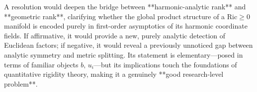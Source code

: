 A resolution would deepen the bridge between **harmonic-analytic rank** and **geometric rank**, clarifying whether the global product structure of a \(\mathrm{Ric}\ge0\) manifold is encoded purely in first-order asymptotics of its harmonic coordinate fields.  
If affirmative, it would provide a new, purely analytic detection of Euclidean factors; if negative, it would reveal a previously unnoticed gap between analytic symmetry and metric splitting.  
Its statement is elementary—posed in terms of familiar objects \(b,\,u_i\)—but its implications touch the foundations of quantitative rigidity theory, making it a genuinely **good research-level problem**.